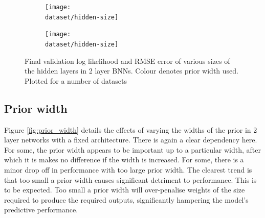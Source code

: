 \begin{figure}[p]
	\def\dataset{\winevar}
	\def\dataname{\winename}
	\begin{subfigure}{0.48\textwidth}
		\texttt{[image: \\dataset/hidden-size]}
		\caption{\dataname}
		\label{fig:hidden_width_\dataset}
	\end{subfigure}
	\def\dataset{\yachtnvar}
	\def\dataname{\yachtname}
	\begin{subfigure}{0.48\textwidth}
		\texttt{[image: \\dataset/hidden-size]}
		\caption{\dataname}
		\label{fig:hidden_width_\dataset}
	\end{subfigure}

	\caption{Final validation log likelihood and RMSE error of various sizes of the hidden layers in 2 layer BNNs. Colour denotes prior width used. Plotted for a number of datasets}
	\label{fig:hidden_width}
\end{figure}

\subsection{Prior width}

Figure \ref{fig:prior_width} details the effects of varying the widths of the prior in 2 layer networks with a fixed architecture. There is again a clear dependency here. For some, the prior width appears to be important up to a particular width, after which it is makes no difference if the width is increased. For some, there is a minor drop off in performance with too large prior width. The clearest trend is that too small a prior width causes significant detriment to performance. This is to be expected. Too small a prior width will over-penalise weights of the size required to produce the required outputs, significantly hampering the model's predictive performance. 

